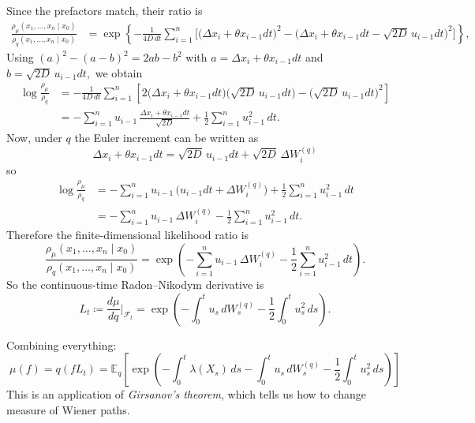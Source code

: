 \documentclass[11pt]{article}
\begin{document}
Since the prefactors match, their ratio is
\begin{align}
\frac{\rho_\mu(x_1,\dots,x_n\mid x_0)}{\rho_q(x_1,\dots,x_n\mid x_0)}
&=
\exp\!\left\{
-\frac{1}{4D\,dt}\sum_{i=1}^n
\Big[
\big(\Delta x_i+\theta x_{i-1}dt\big)^2
-
\big(\Delta x_i+\theta x_{i-1}dt-\sqrt{2D}\,u_{i-1}dt\big)^2
\Big]
\right\},
\end{align}
Using $(a)^2-(a-b)^2 = 2ab-b^2$ with
\(
a=\Delta x_i+\theta x_{i-1}dt
\)
and
\(
b=\sqrt{2D}\,u_{i-1}dt,
\)
we obtain
\begin{align}
\log\frac{\rho_\mu}{\rho_q}
&=
-\frac{1}{4D\,dt}\sum_{i=1}^n
\left[
2\big(\Delta x_i+\theta x_{i-1}dt\big)\big(\sqrt{2D}\,u_{i-1}dt\big)
-\big(\sqrt{2D}\,u_{i-1}dt\big)^2
\right] \\
&=
-\sum_{i=1}^n u_{i-1}\,\frac{\Delta x_i+\theta x_{i-1}dt}{\sqrt{2D}}
+\frac12\sum_{i=1}^n u_{i-1}^2\,dt.
\end{align}
Now, under $q$ the Euler increment can be written as
\begin{equation}
\Delta x_i+\theta x_{i-1}dt
=
\sqrt{2D}\,u_{i-1}dt + \sqrt{2D}\,\Delta W_i^{(q)}
\end{equation}
so
\begin{align}
\log\frac{\rho_\mu}{\rho_q}
&=
-\sum_{i=1}^n u_{i-1}\,\big(u_{i-1}dt+\Delta W_i^{(q)}\big)
+\frac12\sum_{i=1}^n u_{i-1}^2\,dt \\
&=
-\sum_{i=1}^n u_{i-1}\,\Delta W_i^{(q)}
-\frac12\sum_{i=1}^n u_{i-1}^2\,dt.
\end{align}
Therefore the finite-dimensional likelihood ratio is
\begin{equation}
\frac{\rho_\mu(x_1,\dots,x_n\mid x_0)}{\rho_q(x_1,\dots,x_n\mid x_0)}
=
\exp\!\left(
-\sum_{i=1}^n u_{i-1}\,\Delta W_i^{(q)}
-\frac12\sum_{i=1}^n u_{i-1}^2\,dt
\right).
\end{equation}
So the continuous-time Radon--Nikodym derivative is
\begin{equation}
L_t \coloneqq \frac{d\mu}{dq}\Big|_{\mathcal F_t}
=
\exp\!\left(
-\int_0^t u_s\,dW_s^{(q)}
-\frac12\int_0^t u_s^2\,ds
\right).
\end{equation}

Combining everything: 
\begin{equation}\label{eq:muimportance}
\mu(f) =  q(fL_t) = {\mathbb E}_{q}\!\left[
\exp\!\left(-\int_0^t \lambda(X_s)\,ds-\int_0^t u_s\,dW_s^{(q)}
-\frac12\int_0^t u_s^2\,ds
\right)
\right] 
\end{equation}
This is an application of \emph{Girsanov's theorem}, which tells us how to change measure of Wiener paths. 
\end{document}
